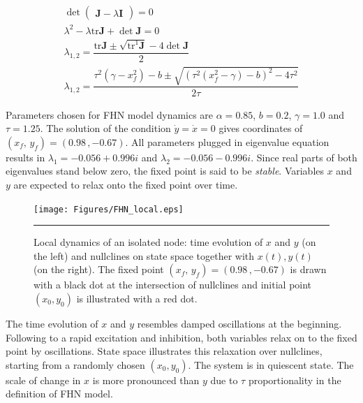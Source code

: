 \begin{subequations}
\begin{align} \det \begin{pmatrix} \textbf{J} - \lambda \textbf{I} \end{pmatrix} = 0
              \label{eqn: frobenius 8}\\  
 \lambda^2 - \lambda \mathrm{tr} \textbf{J} + \det \textbf{J} = 0
               \label{eqn: frobenius 9} \\
\lambda_{1,2} = \dfrac{\mathrm{tr} \textbf{J} \pm \sqrt{\mathrm{tr} ^1 \textbf{J}} -4 \det \textbf{J} }{2}               
                \label{eqn: frobenius 10} \\    
\lambda_{1,2} = \dfrac{\tau^2(\gamma - x_f^2)-b \pm \sqrt{(\tau^2(x_f^2-\gamma)-b)^2 - 4 \tau^2 }}{2 \tau}
               \label{eqn: frobenius 11}                 
               \end{align} 
\end{subequations}

Parameters chosen for FHN model dynamics are $\alpha = 0.85$, $b=0.2$, $\gamma=1.0$ and $\tau=1.25$. The solution of the condition $\dot{y}=\dot{x}=0$ gives coordinates of $(x_f, \, y_f) = (0.98 \, , -0.67 )$. All parameters plugged in eigenvalue equation results in $\lambda_1 = -0.056 + 0.996 i$ and $\lambda_2 = -0.056 - 0.996 i$. Since real parts of both eigenvalues stand below zero, the fixed point is said to be \textit{stable}. Variables $x$ and $y$ are expected to relax onto the fixed point over time.  

\begin{figure}[htbp]
  \centering
	\texttt{[image: Figures/FHN\_local.eps]}
 
    \rule{35em}{0.5pt}
    \caption[FHN Local]{Local dynamics of an isolated node: time evolution of $x$ and  $y$ (on the left) and nullclines on state space together with $x(t),y(t)$ (on the right). The fixed point $(x_f, \, y_f) = (0.98 \, , -0.67 )$ is drawn with a black dot at the intersection of nullclines and initial point $(x_0, y_0)$ is illustrated with a red dot.  }
  \label{fig:FHN Local}	
\end{figure}

The time evolution of $x$ and $y$ resembles damped oscillations at the beginning. Following to a rapid excitation and inhibition, both variables relax on to the fixed point by oscillations. State space illustrates this relaxation over nullclines, starting from a randomly chosen $(x_0, y_0)$. The system is in quiescent state. The scale of change in $x$  is more pronounced than $y$ due to $\tau$ proportionality in the definition of FHN model.  
 

